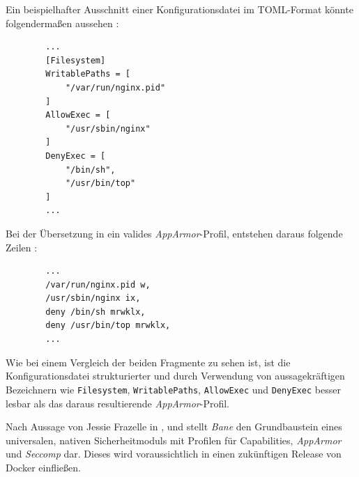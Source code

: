 \documentclass[../main.tex]{subfiles}
\begin{document}
      Ein beispielhafter Ausschnitt einer Konfigurationsdatei im \acrshort{TOML}-Format könnte folgendermaßen aussehen \cite{githubBaneTOML}:

      \begin{lstlisting}
        ...
        [Filesystem]
        WritablePaths = [
        	"/var/run/nginx.pid"
        ]
        AllowExec = [
        	"/usr/sbin/nginx"
        ]
        DenyExec = [
        	"/bin/sh",
        	"/usr/bin/top"
        ]
        ...
      \end{lstlisting}

      Bei der Übersetzung in ein valides \emph{AppArmor}-Profil, entstehen daraus folgende Zeilen \cite{githubBaneAppArmorSample}:

      \begin{lstlisting}
        ...
        /var/run/nginx.pid w,
        /usr/sbin/nginx ix,
        deny /bin/sh mrwklx,
        deny /usr/bin/top mrwklx,
        ...
      \end{lstlisting}

      Wie bei einem Vergleich der beiden Fragmente zu sehen ist, ist die Konfigurationsdatei strukturierter und durch Verwendung von aussagekräftigen Bezeichnern wie \texttt{Filesystem}, \texttt{WritablePaths}, \texttt{AllowExec} und \texttt{DenyExec} besser lesbar als das daraus resultierende \emph{AppArmor}-Profil.

      Nach Aussage von Jessie Frazelle in
      \cite{githubBane}, \cite{githubGeneralSecProfiles}
      und \cite{docker110Security} stellt \emph{Bane} den Grundbaustein eines universalen, nativen Sicherheitmoduls mit Profilen für Capabilities, \emph{AppArmor} und \emph{Seccomp} dar. Dieses wird voraussichtlich in einen zukünftigen Release von Docker einfließen.
\end{document}
